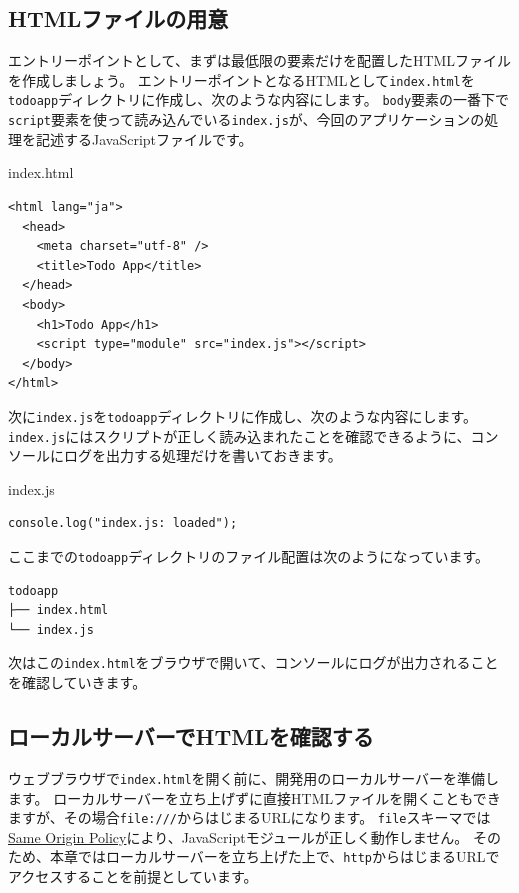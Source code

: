 \hypertarget{preparing-html}{%
\subsection{HTMLファイルの用意}\label{preparing-html}}

エントリーポイントとして、まずは最低限の要素だけを配置したHTMLファイルを作成しましょう。
エントリーポイントとなるHTMLとして\texttt{index.html}を\texttt{todoapp}ディレクトリに作成し、次のような内容にします。
\texttt{body}要素の一番下で\texttt{script}要素を使って読み込んでいる\texttt{index.js}が、今回のアプリケーションの処理を記述するJavaScriptファイルです。

\begin{listtitle}
index.html
\end{listtitle}
\begin{lstlisting}
<html lang="ja">
  <head>
    <meta charset="utf-8" />
    <title>Todo App</title>
  </head>
  <body>
    <h1>Todo App</h1>
    <script type="module" src="index.js"></script>
  </body>
</html>
\end{lstlisting}
\listend

次に\texttt{index.js}を\texttt{todoapp}ディレクトリに作成し、次のような内容にします。
\texttt{index.js}にはスクリプトが正しく読み込まれたことを確認できるように、コンソールにログを出力する処理だけを書いておきます。

\begin{listtitle}
index.js
\end{listtitle}
\begin{lstlisting}
console.log("index.js: loaded");
\end{lstlisting}
\listend

ここまでの\texttt{todoapp}ディレクトリのファイル配置は次のようになっています。

\begin{lstlisting}
todoapp
├── index.html
└── index.js
\end{lstlisting}

次はこの\texttt{index.html}をブラウザで開いて、コンソールにログが出力されることを確認していきます。

\hypertarget{local-server}{%
\subsection{ローカルサーバーでHTMLを確認する}\label{local-server}}

ウェブブラウザで\texttt{index.html}を開く前に、開発用のローカルサーバーを準備します。
ローカルサーバーを立ち上げずに直接HTMLファイルを開くこともできますが、その場合\texttt{file:///}からはじまるURLになります。
\texttt{file}スキーマでは\href{https://developer.mozilla.org/ja/docs/Web/Security/Same-origin_policy}{Same
Origin Policy}により、JavaScriptモジュールが正しく動作しません。
そのため、本章ではローカルサーバーを立ち上げた上で、\texttt{http}からはじまるURLでアクセスすることを前提としています。

